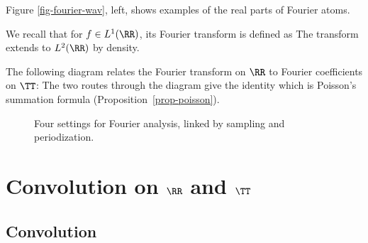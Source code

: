 Figure \ref{fig-fourier-wav}, left, shows examples of the real parts of Fourier atoms.



We recall that for $f \in L^1(\RR)$, its Fourier transform is defined as
The transform extends to $L^2(\RR)$ by density.

The following diagram relates the Fourier transform on $\RR$ to Fourier coefficients on $\TT$:
The two routes through the diagram give the identity
which is Poisson's summation formula (Proposition~\ref{prop-poisson}).



\begin{figure}[tbp]
\centering
{}
\caption{Four settings for Fourier analysis, linked by sampling and periodization.}
\label{fig-fourier-transforms}
\end{figure}



\section{Convolution on \texorpdfstring{$\RR$ and $\TT$}{the Line and the Circle}}

\subsection{Convolution}

